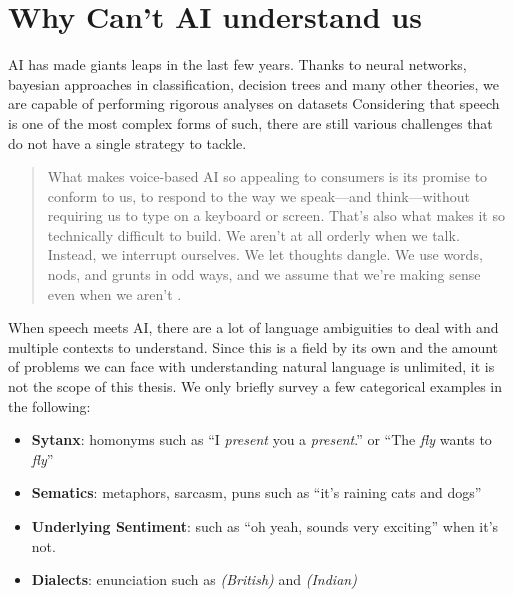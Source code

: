 


\section{Why Can't AI understand us}

AI has made giants leaps in the last few years. Thanks to neural networks, bayesian approaches in classification, decision trees and many other theories, we are capable of performing rigorous analyses on datasets
Considering that speech is one of the most complex forms of such, there are still various challenges that do not have a single strategy to tackle.

\begin{quotation}
What makes voice-based AI so appealing to consumers is its promise to conform to us, to respond to the way we speak—and think—without requiring us to type on a keyboard or screen. That’s also what makes it so technically difficult to build. We aren’t at all orderly when we talk. Instead, we interrupt ourselves. We let thoughts dangle. We use words, nods, and grunts in odd ways, and we assume that we’re making sense even when we aren’t \cite{mit:Alexa}.
\end{quotation}

When speech meets AI, there are a lot of language ambiguities to deal with and multiple contexts to understand. Since this is a field by its own and the amount of problems we can face with understanding natural language is unlimited, it is not the scope of this thesis. We only briefly survey a few categorical examples in the following:
\begin{itemize}
	\item \textbf{Sytanx}: homonyms such as ``I \textit{present} you a \textit{present}.'' or ``The \textit{fly} wants to \textit{fly}''
	
	\item \textbf{Sematics}: metaphors, sarcasm, puns such as ``it’s raining cats and dogs''
	
	\item \textbf{Underlying Sentiment}: such as ``oh yeah, sounds very exciting'' when it's not.
	
	\item \textbf{Dialects}: enunciation such as \textipa{[dI"vE|9pm9nt]} \textit{(British)} and \textipa{[d9v"|Apm9nt]} \textit{(Indian)}

\end{itemize}

